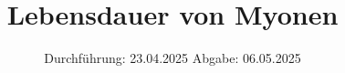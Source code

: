 

\subject{V01}
\title{Lebensdauer von Myonen}
\date{%
  Durchführung: 23.04.2025
  \hspace{3em}
  Abgabe: 06.05.2025
}



\maketitle
\thispagestyle{empty}
\tableofcontents
\newpage






\printbibliography{}
\appendix
\setcounter{secnumdepth}{0}

